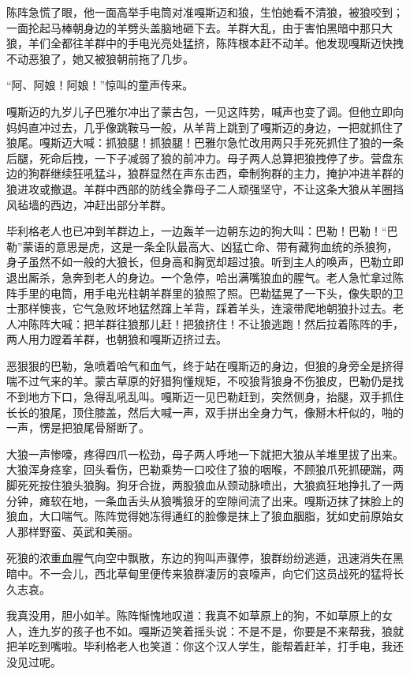 \par 陈阵急慌了眼，他一面高举手电筒对准嘎斯迈和狼，生怕她看不清狼，被狼咬到；一面抡起马棒朝身边的羊劈头盖脑地砸下去。羊群大乱，由于害怕黑暗中那只大狼，羊们全都往羊群中的手电光亮处猛挤，陈阵根本赶不动羊。他发现嘎斯迈快拽不动恶狼了，她又被狼朝前拖了几步。
\par “阿、阿娘！阿娘！”惊叫的童声传来。
\par 嘎斯迈的九岁儿子巴雅尔冲出了蒙古包，一见这阵势，喊声也变了调。但他立即向妈妈直冲过去，几乎像跳鞍马一般，从羊背上跳到了嘎斯迈的身边，一把就抓住了狼尾。嘎斯迈大喊：抓狼腿！抓狼腿！巴雅尔急忙改用两只手死死抓住了狼的一条后腿，死命后拽，一下子减弱了狼的前冲力。母子两人总算把狼拽停了步。营盘东边的狗群继续狂吼猛斗，狼群显然在声东击西，牵制狗群的主力，掩护冲进羊群的狼进攻或撤退。羊群中西部的防线全靠母子二人顽强坚守，不让这条大狼从羊圈挡风毡墙的西边，冲赶出部分羊群。
\par 毕利格老人也已冲到羊群边上，一边轰羊一边朝东边的狗大叫：巴勒！巴勒！“巴勒”蒙语的意思是虎，这是一条全队最高大、凶猛亡命、带有藏狗血统的杀狼狗，身子虽然不如一般的大狼长，但身高和胸宽却超过狼。听到主人的唤声，巴勒立即退出厮杀，急奔到老人的身边。一个急停，哈出满嘴狼血的腥气。老人急忙拿过陈阵手里的电筒，用手电光柱朝羊群里的狼照了照。巴勒猛晃了一下头，像失职的卫士那样懊丧，它气急败坏地猛然蹿上羊背，踩着羊头，连滚带爬地朝狼扑过去。老人冲陈阵大喊：把羊群往狼那儿赶！把狼挤住！不让狼逃跑！然后拉着陈阵的手，两人用力蹚着羊群，也朝狼和嘎斯迈挤过去。
\par 恶狠狠的巴勒，急喷着哈气和血气，终于站在嘎斯迈的身边，但狼的身旁全是挤得喘不过气来的羊。蒙古草原的好猎狗懂规矩，不咬狼背狼身不伤狼皮，巴勒仍是找不到地方下口，急得乱吼乱叫。嘎斯迈一见巴勒赶到，突然侧身，抬腿，双手抓住长长的狼尾，顶住膝盖，然后大喊一声，双手拼出全身力气，像掰木杆似的，啪的一声，愣是把狼尾骨掰断了。
\par 大狼一声惨嚎，疼得四爪一松劲，母子两人呼地一下就把大狼从羊堆里拔了出来。大狼浑身痉挛，回头看伤，巴勒乘势一口咬住了狼的咽喉，不顾狼爪死抓硬踹，两脚死死按住狼头狼胸。狗牙合拢，两股狼血从颈动脉喷出，大狼疯狂地挣扎了一两分钟，瘫软在地，一条血舌头从狼嘴狼牙的空隙间流了出来。嘎斯迈抹了抹脸上的狼血，大口喘气。陈阵觉得她冻得通红的脸像是抹上了狼血胭脂，犹如史前原始女人那样野蛮、英武和美丽。
\par 死狼的浓重血腥气向空中飘散，东边的狗叫声骤停，狼群纷纷逃遁，迅速消失在黑暗中。不一会儿，西北草甸里便传来狼群凄厉的哀嚎声，向它们这员战死的猛将长久志哀。
\par 我真没用，胆小如羊。陈阵惭愧地叹道：我真不如草原上的狗，不如草原上的女人，连九岁的孩子也不如。嘎斯迈笑着摇头说：不是不是，你要是不来帮我，狼就把羊吃到嘴啦。毕利格老人也笑道：你这个汉人学生，能帮着赶羊，打手电，我还没见过呢。
